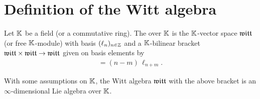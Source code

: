 \section{Definition of the Witt algebra}

\begin{definition}
  \label{def:WittAlgebra}
  \leanok
  Let $\mathbb{K}$ be a field (or a commutative ring). The  over $\mathbb{K}$ is
  the $\mathbb{K}$-vector space $\mathfrak{witt}$ (or free $\mathbb{K}$-module) with basis $(\ell_n)_{n \in \mathbb{Z}}$
  and a $\mathbb{K}$-bilinear bracket $\mathfrak{witt} \times \mathfrak{witt} \to \mathfrak{witt}$ given on basis
  elements by
  \begin{align*}
    [\ell_n , \ell_m] = (n-m) \, \ell_{n+m} .
  \end{align*}
\end{definition}

With some assumptions on $\mathbb{K}$, the Witt algebra $\mathfrak{witt}$ with the above
bracket is an $\infty$-dimensional Lie algebra over $\mathbb{K}$.

